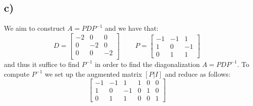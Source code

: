 \documentclass{article}
\begin{document}
\newpage
\subsection*{c)}
We aim to construct $A=PDP^{-1}$ and we have that: $$D=\begin{bmatrix} 
-2 & 0 & 0\\
0 & -2 & 0\\
0 & 0 & -2\\
\end{bmatrix}\;\;\;\;\;\;\;\;P=\begin{bmatrix} 
-1 & -1 & 1\\
1 & 0 & -1\\
0 & 1 & 1
\end{bmatrix}$$
and thus it suffice to find $P^{-1}$ in order to find the diagonalization $A=PDP^{-1}$. 
To compute $P^{-1}$ we set up the augmented matrix $[P|I]$ and reduce as follows: $$\left[\begin{array}{ccc|ccc}
-1&-1&1      &      1&0&0\\
1&0&-1       &      0&1&0\\
0&1&1        &      0&0&1
\end{array}\right]$$
    
\end{document}
